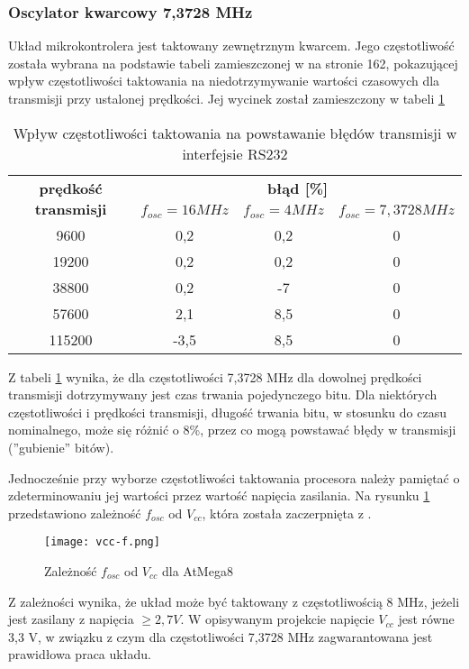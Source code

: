\subsubsection{Oscylator kwarcowy 7,3728 MHz}
Układ mikrokontrolera jest taktowany zewnętrznym kwarcem. Jego częstotliwość została wybrana na podstawie tabeli zamieszczonej w \cite{atmega8} na stronie 162, pokazującej wpływ częstotliwości taktowania na niedotrzymywanie wartości czasowych dla transmisji przy ustalonej prędkości. Jej wycinek został zamieszczony w tabeli \ref{tab_rs232}
\begin{table}[H]
{\centering
	\begin{tabular}{|c|c|c|c|}
		\hline
		\multirow{2}{*}{\textbf{prędkość transmisji}} & \multicolumn{3}{|c|}{\textbf{błąd [\%]}} \\ \cline{2-4}
		& $f_{osc}=16 MHz$ & $f_{osc}=4 MHz$ & $f_{osc}=7,3728 MHz$ \\ \hline \hline
		9600 & 0,2 & 0,2 & 0 \\ \hline
		19200 & 0,2 & 0,2 & 0 \\ \hline
		38800 & 0,2 & -7 & 0 \\ \hline
		57600 & 2,1	& 8,5	& 0 \\ \hline
		115200 & -3,5 & 8,5 & 0 \\ \hline
	\end{tabular}
\caption{Wpływ częstotliwości taktowania na powstawanie błędów transmisji w interfejsie RS232}
\label{tab_rs232}
}
\end{table}
Z tabeli \ref{tab_rs232} wynika, że dla częstotliwości 7,3728 MHz dla dowolnej prędkości transmisji dotrzymywany jest czas trwania pojedynczego bitu. Dla niektórych częstotliwości i prędkości transmisji, długość trwania bitu, w stosunku do czasu nominalnego, może się różnić o 8\%, przez co mogą powstawać błędy w transmisji (''gubienie'' bitów).

Jednocześnie przy wyborze częstotliwości taktowania procesora należy pamiętać o zdeterminowaniu jej wartości przez wartość napięcia zasilania. Na rysunku \ref{vcc-f} przedstawiono zależność $f_{osc}$ od $V_{cc}$, która została zaczerpnięta z \cite{atmega8}.
\begin{figure}[]
  \centering
\texttt{[image: vcc-f.png]}
  \caption{Zależność $f_{osc}$ od $V_{cc}$ dla AtMega8}
	\label{vcc-f}
\end{figure}
Z zależności wynika, że układ może być taktowany z częstotliwością 8 MHz, jeżeli jest zasilany z napięcia $\geq 2,7 V$. W opisywanym projekcie napięcie $V_{cc}$ jest równe 3,3 V, w związku z czym dla częstotliwości 7,3728 MHz zagwarantowana jest prawidłowa praca układu.


